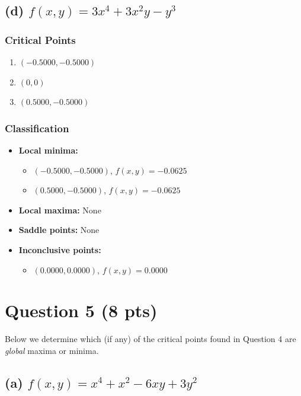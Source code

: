 \documentclass[12pt]{article}
\begin{document}
\hrulefill
\newpage

\subsection*{(d) \( f(x, y) = 3x^4 + 3x^2y - y^3 \)}

\subsubsection*{Critical Points}
\begin{enumerate}
    \item \((-0.5000, -0.5000)\)
    \item \((0, 0)\)
    \item \((0.5000, -0.5000)\)
\end{enumerate}

\subsubsection*{Classification}
\begin{itemize}
    \item \textbf{Local minima:}
    \begin{itemize}
        \item \((-0.5000, -0.5000)\), \( f(x,y) = -0.0625 \)
        \item \((0.5000, -0.5000)\), \( f(x,y) = -0.0625 \)
    \end{itemize}
    \item \textbf{Local maxima:} None
    \item \textbf{Saddle points:} None
    \item \textbf{Inconclusive points:}
    \begin{itemize}
        \item \((0.0000, 0.0000)\), \( f(x,y) = 0.0000 \)
    \end{itemize}
\end{itemize}

\hrulefill
\newpage

\section*{Question 5 (8 pts)}

Below we determine which (if any) of the critical points found in Question 4 
are \emph{global} maxima or minima. 

\subsection*{(a) \texorpdfstring{$f(x, y) = x^4 + x^2 - 6xy + 3y^2$}{f(x, y) = x^4 + x^2 - 6xy + 3y^2}}
\end{document}
